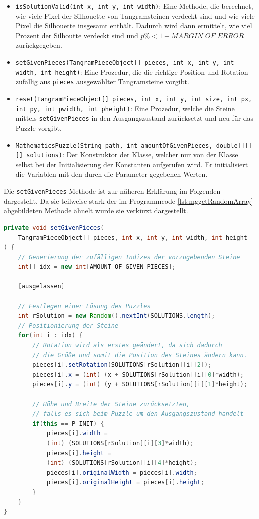 \begin{sloppypar}
\begin{itemize}
        \item \texttt{isSolutionValid(int x, int y, int width)}: Eine Methode, die berechnet, wie viele Pixel der Silhouette von Tangramsteinen verdeckt sind und wie viele Pixel die Silhouette insgesamt enthält.
            Dadurch wird dann ermittelt, wie viel Prozent der Silhoutte verdeckt sind und $p\% < 1-MARGIN\_OF\_ERROR$ zurückgegeben.
        \item \texttt{setGivenPieces(TangramPieceObject[] pieces, int x, int y, int width, int height)}: Eine Prozedur, die die richtige Position und Rotation zufällig aus \texttt{pieces} ausgewählter Tangramsteine vorgibt.
        \item \texttt{reset(TangramPieceObject[] pieces, int x, int y, int size, int px, int py, int pwidth, int pheight)}: Eine Prozedur, welche die Steine mittels \texttt{setGivenPieces} in den Ausgangszustand zurücksetzt und neu für das Puzzle vorgibt.
        \item \texttt{MathematicsPuzzle(String path, int amountOfGivenPieces, double[][][] solutions)}: Der Konstruktor der Klasse, welcher nur von der Klasse selbst bei der Initialisierung der Konstanten aufgerufen wird.
            Er initialisiert die Variablen mit den durch die Parameter gegebenen Werten.
    \end{itemize}
   
\end{sloppypar}

Die \texttt{setGivenPieces}-Methode ist zur näheren Erklärung im Folgenden dargestellt.
Da sie teilweise stark der im Programmcode \ref{lst:mggetRandomArray} abgebildeten Methode ähnelt wurde sie verkürzt dargestellt.

\begin{lstlisting}[caption=update-Methode des TangramPieceObject, label=lst:mggetRandomArray, captionpos=t, language=Java]
private void setGivenPieces(
    TangramPieceObject[] pieces, int x, int y, int width, int height
) {
    // Generierung der zufälligen Indizes der vorzugebenden Steine
    int[] idx = new int[AMOUNT_OF_GIVEN_PIECES];
    
    [ausgelassen]

    // Festlegen einer Lösung des Puzzles
    int rSolution = new Random().nextInt(SOLUTIONS.length);
    // Positionierung der Steine
    for(int i : idx) {
        // Rotation wird als erstes geändert, da sich dadurch
        // die Größe und somit die Position des Steines ändern kann.
        pieces[i].setRotation(SOLUTIONS[rSolution][i][2]);
        pieces[i].x = (int) (x + SOLUTIONS[rSolution][i][0]*width);
        pieces[i].y = (int) (y + SOLUTIONS[rSolution][i][1]*height);

        // Höhe und Breite der Steine zurücksetzten,
        // falls es sich beim Puzzle um den Ausgangszustand handelt
        if(this == P_INIT) {
            pieces[i].width =
            (int) (SOLUTIONS[rSolution][i][3]*width);
            pieces[i].height =
            (int) (SOLUTIONS[rSolution][i][4]*height);
            pieces[i].originalWidth = pieces[i].width;
            pieces[i].originalHeight = pieces[i].height;
        }
    }
}
\end{lstlisting}

